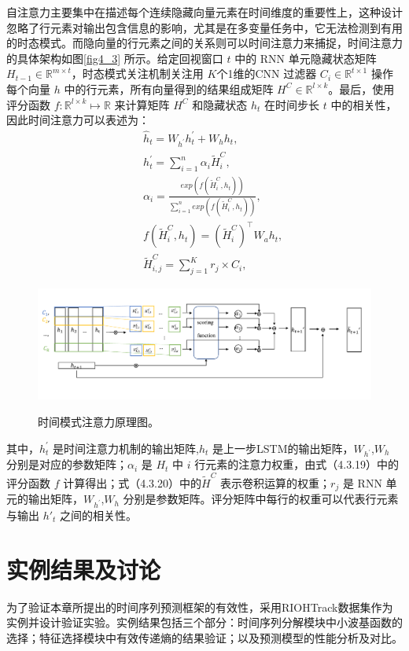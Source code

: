 自注意力主要集中在描述每个连续隐藏向量元素在时间维度的重要性上，这种设计忽略了行元素对输出包含信息的影响，尤其是在多变量任务中，它无法检测到有用的时态模式。而隐向量的行元素之间的关系则可以时间注意力来捕捉，时间注意力的具体架构如图\ref{fig4_3} 所示。给定回视窗口 $t$ 中的 RNN 单元隐藏状态矩阵 $H_{t-1} \in \mathbb{R}^{m\times t}$，时态模式关注机制关注用 $K$个1维的CNN 过滤器 $C_{i}\in \mathbb{R}^{t\times 1}$ 操作每个向量 $h$ 中的行元素，所有向量得到的结果组成矩阵 $H^{C} \in \mathbb{R}^{l\times k}$。最后，使用评分函数 $f: \mathbb{R}^{l\times k}\longmapsto \mathbb{R} $ 来计算矩阵 $H^{C}$ 和隐藏状态 $h_{t}$ 在时间步长 $t$ 中的相关性，因此时间注意力可以表述为：
\begin{eqnarray}
&& \hat{h}_{t} = W_{h^{'}}h^{'}_{t}+W_{h}h_{t},\\
&& h^{'}_{t} = \sum^n_{i=1}\alpha_{i}\widetilde{H}^{C}_{i},\\
&& \alpha_{i} = \frac{exp(f(\widetilde{H}^{C}_{i},h_{t}))}{\sum^{n}_{i=1} exp(f(\widetilde{H}^{C}_{i},h_{t}))},\\
&& f(\widetilde{H}^{C}_{i},h_{t}) = (\widetilde{H}_{i}^{C})^{\top}W_{a}h_{t},\\
&& \widetilde{H}_{i,j}^{C} = \sum^{K}_{j = 1} r_{j} \times C_{i},
\end{eqnarray}


\begin{figure}[htbp]
\begin{center}
\includegraphics[scale=0.4]{./ch4/fig4_3.pdf}
\caption{时间模式注意力原理图。}\label{fig4_3}
\label{fig2}
\end{center}
\end{figure}
其中，$h^{'}_{t}$ 是时间注意力机制的输出矩阵,$h_{t}$ 是上一步LSTM的输出矩阵，$W_{h^{'}}$,$W_{h}$ 分别是对应的参数矩阵；$\alpha_{i}$ 是 $H_{t}$ 中 $i$ 行元素的注意力权重，由式（4.3.19）中的评分函数 $f$ 计算得出；式（4.3.20）中的$\widetilde{H}^{C}$ 表示卷积运算的权重；$r_{j}$ 是 RNN 单元的输出矩阵，$W_{h^{'}}$,$W_{h}$ 分别是参数矩阵。评分矩阵中每行的权重可以代表行元素与输出 $h'_{t}$ 之间的相关性。


\section{实例结果及讨论}\label{ne}
为了验证本章所提出的时间序列预测框架的有效性，采用RIOHTrack数据集作为实例并设计验证实验。实例结果包括三个部分：时间序列分解模块中小波基函数的选择；特征选择模块中有效传递熵的结果验证；以及预测模型的性能分析及对比。
